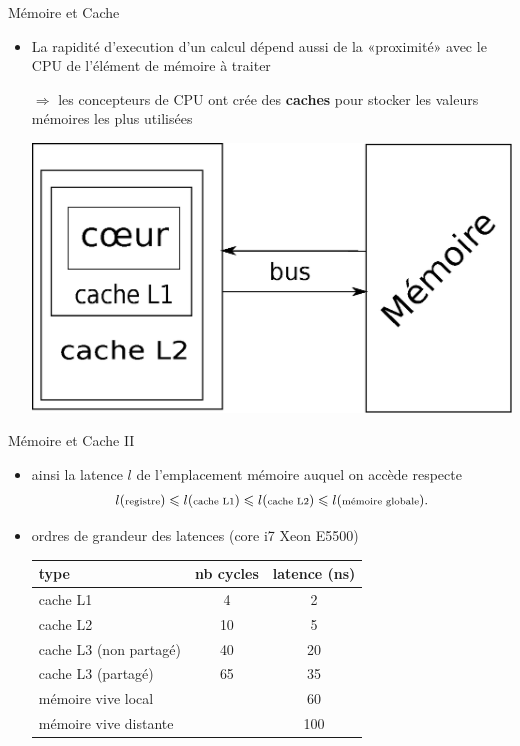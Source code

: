 \documentclass[11pt,mathserif]{beamer}
\begin{document}
\begin{frame}{Mémoire et Cache}
\begin{itemize}[<+->]
  \item La rapidité d'execution d'un calcul dépend aussi de la «proximité» avec le CPU de l'élément de mémoire à traiter 
  \item[$\Rightarrow$] les concepteurs de CPU ont crée des {\bf caches} pour stocker les valeurs mémoires les plus utilisées
  \begin{center}
    \includegraphics[width=0.7\linewidth]{cpu_classique.eps}
  \end{center}
\end{itemize}
\end{frame}
\begin{frame}{Mémoire et Cache II}
\pause
  \begin{itemize}[<+->]
  \item ainsi la latence $l$ de l'emplacement mémoire auquel on accède  respecte
  $$l({\mbox{\scriptsize registre}}) \leqslant l(\mbox{\scriptsize cache L1}) \leqslant
    l(\mbox{\scriptsize cache L2}) \leqslant l(\mbox{\scriptsize mémoire globale}).$$
  \item ordres de grandeur des latences (core i7 Xeon E5500)
    \begin{tabular}{|l|c|c|}
    \hline
      type & nb cycles & latence (ns)  \\
    \hline
      cache L1  &  4 & 2 \\
      cache L2  &  10 & 5 \\
      cache L3 (non partagé) & 40 & 20  \\
      cache L3 (partagé) &  65 & 35  \\
      mémoire vive local & & 60 \\
      mémoire vive distante & & 100 \\
    \hline
    \end{tabular}
  \end{itemize}
\end{frame}
\end{document}
